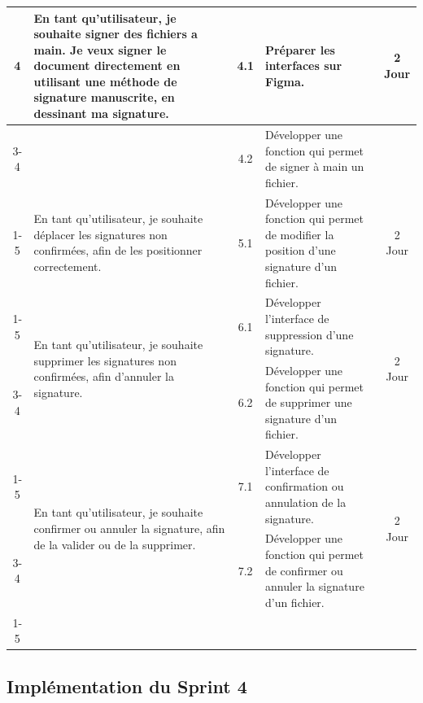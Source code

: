 \begin{adjustwidth}{-1cm}{}
\begin{longtable}{|c|p{6cm}|c|p{6cm}|c|}
      \multirow{3}{*}{4} & En tant qu'utilisateur, je souhaite signer des fichiers a main. Je veux signer le document directement en utilisant une méthode de signature manuscrite, en dessinant ma signature. & 4.1 & Préparer les interfaces sur Figma. & \multirow{3}{*}{2 Jour} \\
      \cline{3-4}
      & & 4.2 & Développer une fonction qui permet de signer à main un fichier. & \\
      \cline{1-5}

      \multirow{1}{*}{5} & En tant qu'utilisateur, je souhaite déplacer les signatures non confirmées, afin de les positionner correctement.& 5.1 & Développer une fonction qui permet de modifier la position d'une signature d'un fichier. & \multirow{1}{*}{2 Jour} \\
      \cline{1-5}

      \multirow{2}{*}{6} & \multirow{2}{6cm}{En tant qu'utilisateur, je souhaite supprimer les signatures non confirmées, afin d'annuler la signature.}& 6.1 & Développer l'interface de suppression d'une signature. & \multirow{2}{*}{2 Jour} \\
      \cline{3-4}
      & & 6.2 & Développer une fonction qui permet de supprimer une signature d'un fichier. & \\
      \cline{1-5}

      \multirow{2}{*}{7} &\multirow{2}{6cm}{ En tant qu'utilisateur, je souhaite confirmer ou annuler la signature, afin de la valider ou de la supprimer.}& 7.1 & Développer l'interface de confirmation ou annulation de la signature. & \multirow{2}{*}{2 Jour} \\
      \cline{3-4}
      & & 7.2 & Développer une fonction qui permet de confirmer ou annuler la signature d'un fichier. & \\
      \cline{1-5}
      
  \hline

\end{longtable}
\end{adjustwidth}

\subsection{Implémentation du Sprint 4}
